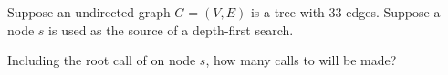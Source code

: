\begin{prob}

    Suppose an undirected graph $G = (V, E)$ is a tree with 33 edges. Suppose a node $s$ is used as the source
    of a depth-first search.

    Including the root call of  on node $s$, how many calls to  will be made?


\end{prob}
